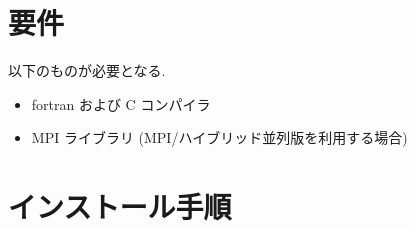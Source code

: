 \documentclass[letterpaper,10pt,dvipdfmx,openany]{sphinxmanual}
\begin{document}
\section{要件}
\label{\detokenize{install:id3}}
\sphinxAtStartPar
以下のものが必要となる.
\begin{itemize}
\item {} 
\sphinxAtStartPar
fortran および C コンパイラ

\item {} 
\sphinxAtStartPar
MPI ライブラリ (MPI/ハイブリッド並列版を利用する場合)

\end{itemize}


\section{インストール手順}
\end{document}
